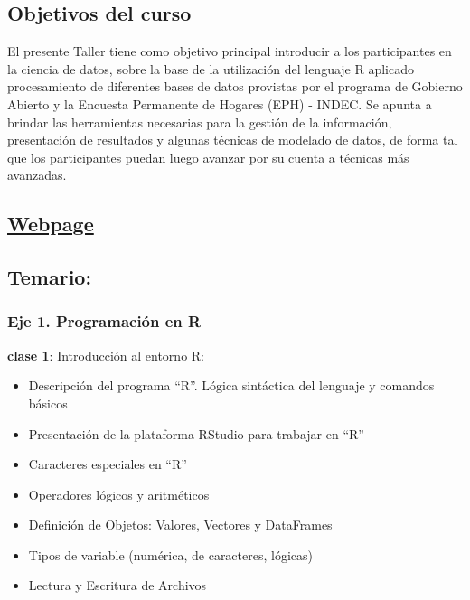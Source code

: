 \documentclass[]{book}
\providecommand{\tightlist}{%
  \setlength{\itemsep}{0pt}\setlength{\parskip}{0pt}}
\begin{document}
\hypertarget{objetivos-del-curso}{%
\subsection*{Objetivos del curso}\label{objetivos-del-curso}}

El presente Taller tiene como objetivo principal introducir a los participantes en la ciencia de datos, sobre la base de la utilización del lenguaje R aplicado procesamiento de diferentes bases de datos provistas por el programa de Gobierno Abierto y la Encuesta Permanente de Hogares (EPH) - INDEC. Se apunta a brindar las herramientas necesarias para la gestión de la información, presentación de resultados y algunas técnicas de modelado de datos, de forma tal que los participantes puedan luego avanzar por su cuenta a técnicas más avanzadas.

\hypertarget{webpage}{%
\subsection*{\texorpdfstring{\href{https://diegokoz.github.io/intro_ds/}{Webpage}}{Webpage}}\label{webpage}}

\hypertarget{temario}{%
\subsection*{Temario:}\label{temario}}

\hypertarget{eje-1.-programacion-en-r}{%
\subsubsection*{\texorpdfstring{\textbf{Eje 1. Programación en R}}{Eje 1. Programación en R}}\label{eje-1.-programacion-en-r}}

\textbf{clase 1}: Introducción al entorno R:

\begin{itemize}
\tightlist
\item
  Descripción del programa ``R''. Lógica sintáctica del lenguaje y comandos básicos
\item
  Presentación de la plataforma RStudio para trabajar en ``R''
\item
  Caracteres especiales en ``R''
\item
  Operadores lógicos y aritméticos
\item
  Definición de Objetos: Valores, Vectores y DataFrames
\item
  Tipos de variable (numérica, de caracteres, lógicas)
\item
  Lectura y Escritura de Archivos
\end{itemize}
\end{document}
